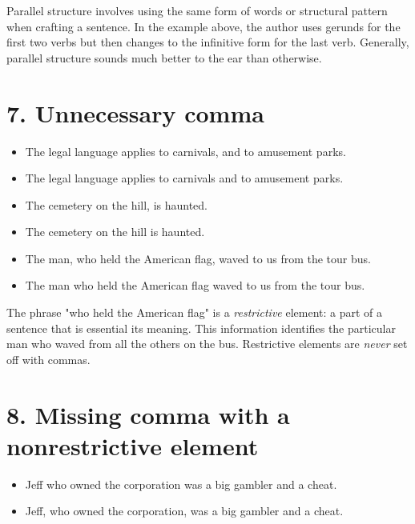 \noindent Parallel structure involves using the same form of words or structural pattern when crafting a sentence. In the example above, the author uses gerunds for the first two verbs but then changes to the infinitive form for the last verb. Generally, parallel structure sounds much better to the ear than otherwise. 


\section{7. Unnecessary comma} 
\begin{itemize}
\item The legal language applies to carnivals, and to amusement parks.  

\item The legal language applies to carnivals and to amusement parks.  
\end{itemize}
\medskip
\begin{itemize}
\item The cemetery on the hill, is haunted. 

\item The cemetery on the hill is haunted. 
\end{itemize}
\medskip
\begin{itemize}
\item The man, who held the American flag, waved to us from the tour bus.  

\item The man who held the American flag waved to us from the tour bus.  
\end{itemize}

\noindent The phrase "who held the American flag" is a \emph{restrictive} element: a part of a sentence that is essential its meaning. This information identifies the particular man who waved from all the others on the bus. Restrictive elements are \emph{never} set off with commas. 


\section{8. Missing comma with a nonrestrictive element} 

\begin{itemize}
\item Jeff who owned the corporation was a big gambler and a cheat. 

\item Jeff, who owned the corporation, was a big gambler and a cheat. 
\end{itemize}

